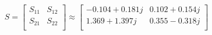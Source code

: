 \[
S = \left[ \begin{array}{cc} 
S_{11} & S_{12} \\ 
 S_{21} & S_{22} \\ 
\end{array} \right] 
 \approx \left[ \begin{array}{cc} 
-0.104 +0.181 j & 0.102 +0.154 j \\ 
1.369 +1.397 j & 0.355 -0.318 j \\ 
\end{array} \right] \label{eq:S}
\]